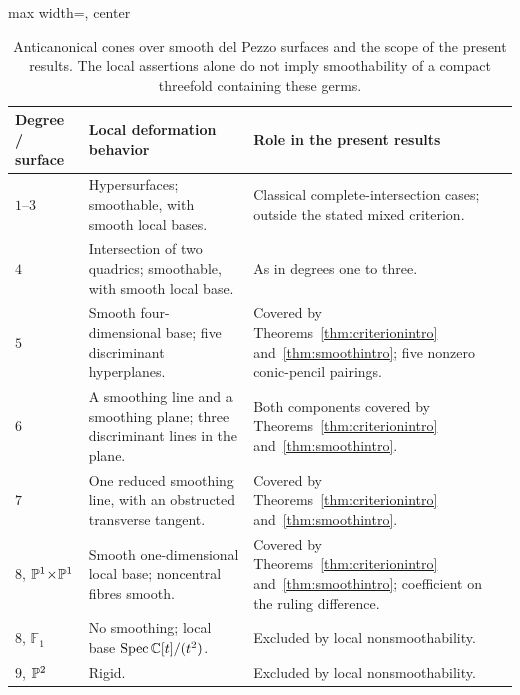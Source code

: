 \begin{table}[htbp]
\centering
\caption{Anticanonical cones over smooth del Pezzo surfaces and the
scope of the present results.  The local assertions alone do not imply
smoothability of a compact threefold containing these germs.}
\label{tab01:degree-scope}
\small
\renewcommand{\arraystretch}{1.14}
\begin{adjustbox}{max width=\textwidth, center}
\begin{tabular}{@{}>{\raggedright\arraybackslash}p{}
                  >{\raggedright\arraybackslash}p{}
                  >{\raggedright\arraybackslash}p{}@{}}
\toprule
Degree / surface & Local deformation behavior & Role in the present results \\
\midrule
$1$--$3$
  & Hypersurfaces; smoothable, with smooth local bases.
  & Classical complete-intersection cases; outside the stated mixed criterion. \\
\addlinespace
$4$
  & Intersection of two quadrics; smoothable, with smooth local base.
  & As in degrees one to three. \\
\addlinespace
$5$
  & Smooth four-dimensional base; five discriminant hyperplanes.
  & Covered by Theorems~\ref{thm:criterionintro}
    and~\ref{thm:smoothintro}; five nonzero conic-pencil pairings. \\
\addlinespace
$6$
  & A smoothing line and a smoothing plane; three discriminant lines in the plane.
  & Both components covered by Theorems~\ref{thm:criterionintro}
    and~\ref{thm:smoothintro}. \\
\addlinespace
$7$
  & One reduced smoothing line, with an obstructed transverse tangent.
  & Covered by Theorems~\ref{thm:criterionintro}
    and~\ref{thm:smoothintro}. \\
\addlinespace
$8$, $\mathbb{P}^1\!\times\!\mathbb{P}^1$
  & Smooth one-dimensional local base; noncentral fibres smooth.
  & Covered by Theorems~\ref{thm:criterionintro}
    and~\ref{thm:smoothintro}; coefficient on the ruling difference. \\
\addlinespace
$8$, $\mathbb F_1$
  & No smoothing; local base $\operatorname{Spec}\mathbb{C}[t]/(t^2)$.
  & Excluded by local nonsmoothability. \\
\addlinespace
$9$, $\mathbb{P}^2$
  & Rigid.
  & Excluded by local nonsmoothability. \\
\bottomrule
\end{tabular}
\end{adjustbox}
\end{table}

